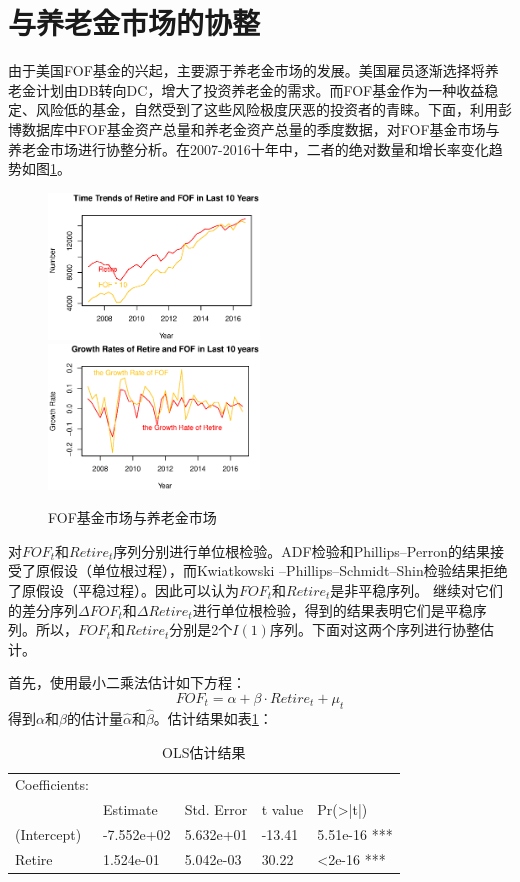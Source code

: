\documentclass[10.5pt,onecolumn,a4paper]{article}%
\begin{document}
\section{与养老金市场的协整}
由于美国FOF基金的兴起，主要源于养老金市场的发展。美国雇员逐渐选择将养老金计划由DB转向DC，增大了投资养老金的需求。而FOF基金作为一种收益稳定、风险低的基金，自然受到了这些风险极度厌恶的投资者的青睐。下面，利用彭博数据库中FOF基金资产总量和养老金资产总量的季度数据，对FOF基金市场与养老金市场进行协整分析。在2007-2016十年中，二者的绝对数量和增长率变化趋势如图\ref{fg:3}。
\begin{figure}
	\caption{FOF基金市场与养老金市场} 
	\label{fg:3}
	\includegraphics[width=0.5\textwidth]{3-0-1.eps}
	\includegraphics[width=0.5\textwidth]{3-0-2.eps}
\end{figure}

对${FOF_t}$和${Retire_t}$序列分别进行单位根检验。ADF检验和Phillips–Perron的结果接受了原假设（单位根过程），而Kwiatkowski –Phillips–Schmidt–Shin检验结果拒绝了原假设（平稳过程）。因此可以认为${FOF_t}$和${Retire_t}$是非平稳序列。
继续对它们的差分序列${\Delta FOF_t}$和${\Delta Retire_t}$进行单位根检验，得到的结果表明它们是平稳序列。所以，${FOF_t}$和${Retire_t}$分别是2个$I(1)$序列。下面对这两个序列进行协整估计。

首先，使用最小二乘法估计如下方程：
$$FOF_t = \alpha + \beta \cdot Retire_t + \mu_t$$
得到$\alpha$和$\beta$的估计量$\hat{\alpha}$和$\hat{\beta}$。估计结果如表\ref{tb:ols}：

\begin{table}[]
    \centering
    \caption{OLS估计结果}
    \label{tb:ols}
    \begin{tabular}{l | llll}
        Coefficients: &            &            &         &                     \\
                      & Estimate   & Std. Error & t value & Pr(\textgreater|t|) \\  \hline
        (Intercept)   & -7.552e+02 & 5.632e+01  & -13.41  & 5.51e-16 ***        \\
        Retire        & 1.524e-01  & 5.042e-03  & 30.22   & \textless 2e-16 ***
    \end{tabular}
\end{table}
\end{document}
